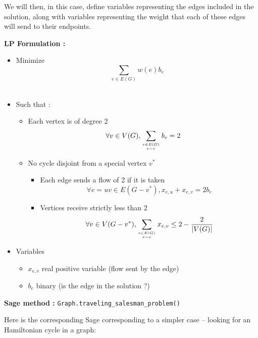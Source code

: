 We will then, in this case, define variables representing the edges included in the solution, along with variables representing the weight that each of these edges will send to their endpoints.

{\bf LP Formulation :}
\begin{itemize}
\item Minimize $$\sum_{e\in E(G)}w(e) b_e$$\\
\item Such that :
  \begin{itemize}
  \item Each vertex is of degree 2
    $$\forall v\in V(G), \sum_{e\in E(G)\atop e\sim v}b_e = 2$$
  \item No cycle disjoint from a special vertex $v^*$
    \begin{itemize}
    \item Each edge sends a flow of 2 if it is taken
      $$\forall e=uv\in E(G-v^*), x_{e,u} + x_{e,v} = 2b_e$$
    \item Vertices receive strictly less than 2
      $$\forall v\in V(G-v^*), \sum_{e\in E(G)\atop e\sim v}x_{e,v}\leq 2-\frac 2 {|V(G)|}$$
    \end{itemize}

  \end{itemize}
\item Variables
  \begin{itemize}
  \item $x_{e,v}$ real positive variable (flow sent by the edge)
  \item $b_e$ binary (is the edge in the solution ?)

  \end{itemize}
\end{itemize}

{\bf Sage method : }\verb!Graph.traveling_salesman_problem()!

Here is the corresponding Sage corresponding to a simpler case -- looking for an Hamiltonian cycle in a graph:

